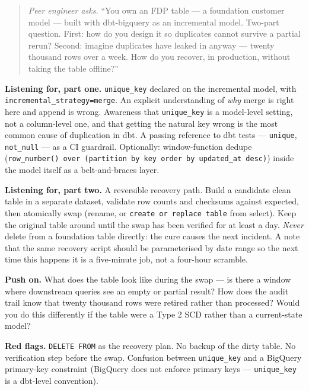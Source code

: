 \documentclass[
  11pt,
  british,
  oneside]{book}
\begin{document}
\begin{quote}
\emph{Peer engineer asks.} ``You own an FDP table --- a foundation
customer model --- built with dbt-bigquery as an incremental model.
Two-part question. First: how do you design it so duplicates cannot
survive a partial rerun? Second: imagine duplicates have leaked in
anyway --- twenty thousand rows over a week. How do you recover, in
production, without taking the table offline?''
\end{quote}

\textbf{Listening for, part one.} \texttt{unique\_key} declared on the
incremental model, with
\texttt{incremental\_strategy=\textquotesingle{}merge\textquotesingle{}}.
An explicit understanding of \emph{why} merge is right here and append
is wrong. Awareness that \texttt{unique\_key} is a model-level setting,
not a column-level one, and that getting the natural key wrong is the
most common cause of duplication in dbt. A passing reference to dbt
tests --- \texttt{unique}, \texttt{not\_null} --- as a CI guardrail.
Optionally: window-function dedupe
(\texttt{row\_number()\ over\ (partition\ by\ key\ order\ by\ updated\_at\ desc)})
inside the model itself as a belt-and-braces layer.

\textbf{Listening for, part two.} A reversible recovery path. Build a
candidate clean table in a separate dataset, validate row counts and
checksums against expected, then atomically swap (rename, or
\texttt{create\ or\ replace\ table} from select). Keep the original
table around until the swap has been verified for at least a day.
\emph{Never} delete from a foundation table directly: the cure causes
the next incident. A note that the same recovery script should be
parameterised by date range so the next time this happens it is a
five-minute job, not a four-hour scramble.

\textbf{Push on.} What does the table look like during the swap --- is
there a window where downstream queries see an empty or partial result?
How does the audit trail know that twenty thousand rows were retired
rather than processed? Would you do this differently if the table were a
Type 2 SCD rather than a current-state model?

\textbf{Red flags.} \texttt{DELETE\ FROM} as the recovery plan. No
backup of the dirty table. No verification step before the swap.
Confusion between \texttt{unique\_key} and a BigQuery primary-key
constraint (BigQuery does not enforce primary keys ---
\texttt{unique\_key} is a dbt-level convention).
\end{document}
